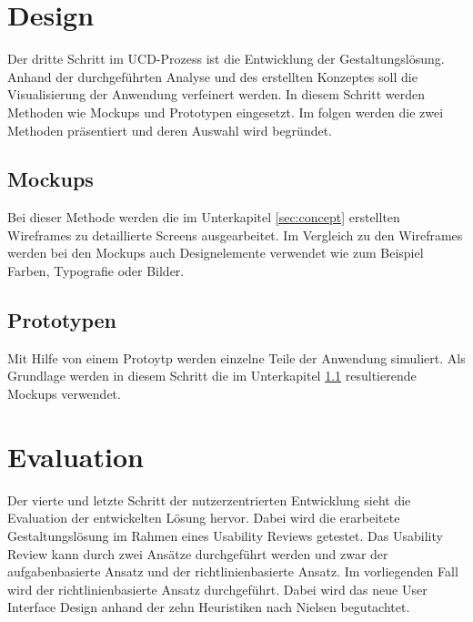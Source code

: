 \section{Design}

Der dritte Schritt im \ac{UCD}-Prozess ist die Entwicklung der Gestaltungslösung.
Anhand der durchgeführten Analyse und des erstellten Konzeptes soll die Visualisierung der Anwendung verfeinert werden.
In diesem Schritt werden Methoden wie Mockups und Prototypen eingesetzt.
Im folgen werden die zwei Methoden präsentiert und deren Auswahl wird begründet.

\subsection{Mockups}\label{sec:mockup}

Bei dieser Methode werden die im Unterkapitel \ref{sec:concept} erstellten Wireframes zu detaillierte Screens ausgearbeitet.
Im Vergleich zu den Wireframes werden bei den Mockups auch Designelemente verwendet wie zum Beispiel Farben, Typografie oder Bilder.

\subsection{Prototypen}

Mit Hilfe von einem Protoytp werden einzelne Teile der Anwendung simuliert.
Als Grundlage werden in diesem Schritt die im Unterkapitel \ref{sec:mockup} resultierende Mockups verwendet.

\section{Evaluation}

Der vierte und letzte Schritt der nutzerzentrierten Entwicklung sieht die Evaluation der entwickelten Lösung hervor.
Dabei wird die erarbeitete Gestaltungslösung im Rahmen eines Usability Reviews getestet.
Das Usability Review kann durch zwei Ansätze durchgeführt werden und zwar der aufgabenbasierte Ansatz und der richtlinienbasierte Ansatz.
Im vorliegenden Fall wird der richtlinienbasierte Ansatz durchgeführt.
Dabei wird das neue User Interface Design anhand der zehn Heuristiken nach Nielsen begutachtet.


